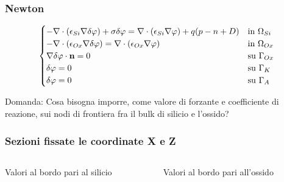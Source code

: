 \begin{frame}
\frametitle{Newton}

\begin{equation*}
\begin{cases}
-\nabla \cdot ( \epsilon_{Si} \nabla \delta\varphi) + \sigma\delta\varphi = \nabla \cdot ( \epsilon_{Si} \nabla \varphi) + q(p-n+D) & \text{in $\Omega_{Si}$}\\
-\nabla \cdot ( \epsilon_{Ox} \nabla \delta\varphi) = \nabla \cdot ( \epsilon_{Ox} \nabla \varphi) & \text{in $\Omega_{Ox}$}\\
\nabla \delta\varphi \cdot \mathbf{n} =0 & \text{su $\Gamma_{Ox}$ }\\
\delta\varphi = 0 & \text{su $\Gamma_{K}$}\\
\delta\varphi = 0 & \text{su $\Gamma_{A}$}\\
\end{cases}
\end{equation*}

\begin{alertblock}{Domanda:}
Cosa bisogna imporre, come valore di forzante e coefficiente di reazione, sui nodi di frontiera fra il bulk di silicio e l'ossido?
\end{alertblock}

\end{frame}


\begin{frame}
\frametitle{Sezioni fissate le coordinate X e Z}
\begin{columns}
\begin{column}{0.5 \textwidth}
\begin{center}
Valori al bordo pari al silicio
\begin{figure}[!h]
\end{figure}
\end{center}
\end{column}
\begin{column}{0.5 \textwidth}
\begin{center}
Valori al bordo pari all'ossido
\begin{figure}[!h]
\end{figure}
\end{center}
\end{column}
\end{columns}

\end{frame}


